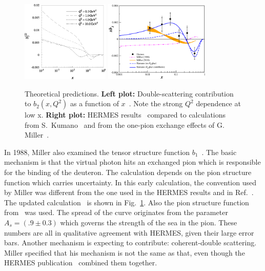 \begin{figure}[t]
\begin{center}
\includegraphics[width=0.3725\textwidth]{figs/bx.eps}
\hspace{0.3cm}
\includegraphics[width=0.45\textwidth]{figs/xb1_mstw_newmiller.eps}
\caption{\label{xb1_pred} Theoretical predictions. {\bf Left plot:} Double-scattering 
contribution to $b_2(x,Q^2)$ as a  function of $x$~\cite{Bora:1997pi}.  Note the strong $Q^2$ dependence at low x.
{\bf Right plot:} HERMES results~\cite{Airapetian:2005cb} compared to calculations 
from S.~Kumano~\cite{Kumano:2010vz} and from the one-pion exchange effects of 
G. Miller~\cite{Miller:1989nc,Miller_tmp}.}
\end{center}
\end{figure}

In 1988, Miller also examined the tensor structure function $b_1$~\cite{Miller:1989nc}.
The basic mechanism is that the virtual photon hits an exchanged pion  which
is responsible for the binding of the deuteron. The calculation depends on the pion 
structure function which carries uncertainty. 
In this early calculation, the convention used by Miller was different from the
one used in the HERMES results and in Ref.~\cite{Kumano:2010vz}. The updated 
calculation~\cite{Miller_tmp} is shown in Fig.~\ref{xb1_pred}. Also the pion structure 
function from~\cite{Sutton:1991ay} was used. The spread of the curve originates from the 
parameter $A_s=(.9 \pm 0.3)$ which governs the strength of the sea in the pion. These 
numbers are all in qualitative agreement with HERMES, given their large error bars.
Another mechanism is expecting to contribute: coherent-double scattering. Miller 
specified that his mechanism is not the same as that, even though the HERMES 
publication~\cite{Airapetian:2005cb} combined them together.

